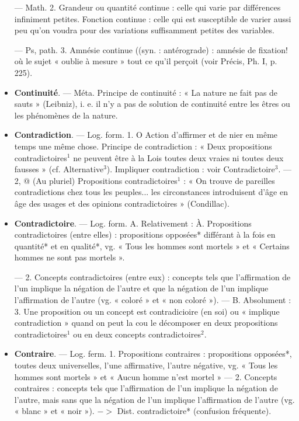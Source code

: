 \begin{itemize}[leftmargin=1cm, label=, itemsep=11pt]
— Math. 2. Grandeur ou quantité
continue : celle qui varie par différences infiniment petites. Fonction
continue : celle qui est susceptible de
varier aussi peu qu’on voudra pour
des variations suffisamment petites
des variables.

— Ps, path. 3. Amnésie continue
((syn. : antérograde) : amnésie de
fixation! où le sujet « oublie à mesure » tout ce qu'il perçoit (voir
Précis, Ph. I, p. 225).

\item {\bf Continuité}. — Méta. Principe de continuité : « La nature ne fait pas de
sauts » (Leibniz), i. e. il n’y a pas de
solution de continuité entre les êtres
ou les phénomènes de la nature.

\item {\bf Contradiction}. — Log. form. 1. O
Action d'affirmer et de nier en même
temps une même chose. Principe de
contradiction : « Deux propositions
contradictoires$^1$ ne peuvent être à la
Lois toutes deux vraies ni toutes deux
fausses » (cf. Alternative$^3$). Impliquer contradiction : voir Contradictoire$^3$. — 2, @ (Au pluriel) Propositions contradictoires$^1$ : « On trouve
de pareilles contradictions chez
tous les peuples... les circonstances
introduisent d'âge en âge des usages
et des opinions contradictoires »
(Condillac).

\item {\bf Contradictoire}. — Log. form. A. Relativement : À. Propositions contradictoires (entre elles) : propositions
opposées* différant à la fois en
quantité* et en qualité*, vg. « Tous
les hommes sont mortels » et « Certains hommes ne sont pas mortels ».

— 2. Concepts contradictoires (entre
eux) : concepts tels que l'affirmation
de l’un implique la négation de
l’autre et que la négation de l’un
implique l'affirmation de l’autre
(vg. « coloré » et « non coloré »). —
B. Absolument : 3. Une proposition
ou un concept est contradicioire (en
soi) ou « implique contradiction »
quand on peut la cou le décomposer
en deux propositions contradictoires$^1$ ou en deux concepts contradictoires$^2$.

\item {\bf Contraire}. — Log. ferm. 1. Propositions contraires : propositions opposées*, toutes deux universelles, l’une
affirmative, l’autre négative, vg.
« Tous les hommes sont mortels » et
« Aucun homme n’est mortel » —
2. Concepts contraires : concepts tels
que l'affirmation de l’un implique
la négation de l’autre, mais sans que
la négation de l'un implique l’affirmation de l’autre (vg. « blanc » et
« noir »). $->$ Dist. contradictoire*
(confusion fréquente).


\end{itemize}
